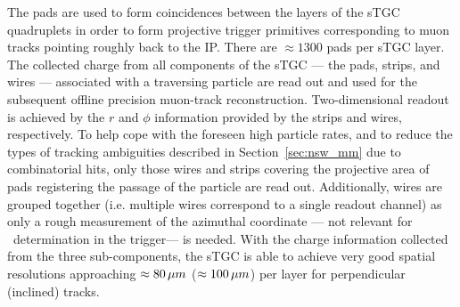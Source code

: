 The pads are used to form coincidences between the layers of the sTGC quadruplets in order
to form projective trigger primitives corresponding to muon tracks pointing roughly back to the IP.
There are $\approx 1300$ pads per sTGC layer.
The collected charge from all components of the sTGC --- the pads, strips, and wires --- associated with a traversing particle are read out and
used for the subsequent offline precision muon-track reconstruction.
Two-dimensional readout is achieved by the $r$ and $\phi$ information provided by the strips
and wires, respectively.
To help cope with the foreseen high particle rates, and to reduce the types of tracking ambiguities
described in Section~\ref{sec:nsw_mm} due to combinatorial hits, only
those wires and strips covering the projective area of pads registering the passage of
the particle are read out.
Additionally, wires are grouped together (i.e. multiple wires correspond to a single readout
channel) as only a rough measurement of the azimuthal coordinate --- not relevant for \pT~determination in the trigger---
is needed.
With the charge information collected from the three sub-components, the sTGC is able to achieve very
good spatial resolutions approaching $\approx 80\,\mu m$ ($\approx 100\,\mu m$) per layer for perpendicular (inclined) tracks.

